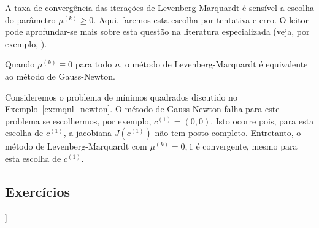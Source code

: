 A taxa de convergência das iterações de Levenberg-Marquardt é sensível a escolha do parâmetro $\mu^{(k)}\geq 0$. Aqui, faremos esta escolha por tentativa e erro. O leitor pode aprofundar-se mais sobre esta questão na literatura especializada (veja, por exemplo, \cite{Bjorck1996a,Nocedal2006a}).

\begin{obs}
  Quando $\mu^{(k)} \equiv 0$ para todo $n$, o método de Levenberg-Marquardt é equivalente ao método de Gauss-Newton.
\end{obs}

\begin{ex}\label{ex:mqnl_LM}
  Consideremos o problema de mínimos quadrados discutido no Exemplo~\ref{ex:mqnl_newton}. O método de Gauss-Newton falha para este problema se escolhermos, por exemplo, $c^{(1)} = (0, 0)$. Isto ocorre pois, para esta escolha de $c^{(1)}$, a jacobiana $J(c^{(1)})$ não tem posto completo. Entretanto, o método de Levenberg-Marquardt com $\mu^{(k)} = 0,1$ é convergente, mesmo para esta escolha de $c^{(1)}$.







\end{ex}

\subsection*{Exercícios}

\begin{flushleft}
  [[tag:revisar]]
\end{flushleft}

